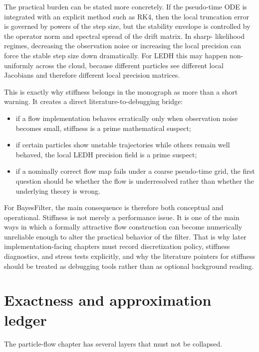 The practical burden can be stated more concretely.  If the pseudo-time ODE is
integrated with an explicit method such as RK4, then the local truncation error
is governed by powers of the step size, but the stability envelope is controlled
by the operator norm and spectral spread of the drift matrix.  In sharp-
likelihood regimes, decreasing the observation noise or increasing the local
precision can force the stable step size down dramatically.  For LEDH this may
happen non-uniformly across the cloud, because different particles see different
local Jacobians and therefore different local precision matrices.

This is exactly why stiffness belongs in the monograph as more than a short
warning.  It creates a direct literature-to-debugging bridge:
\begin{itemize}
  \item if a flow implementation behaves erratically only when observation noise
    becomes small, stiffness is a prime mathematical suspect;
  \item if certain particles show unstable trajectories while others remain well
    behaved, the local LEDH precision field is a prime suspect;
  \item if a nominally correct flow map fails under a coarse pseudo-time grid,
    the first question should be whether the flow is underresolved rather than
    whether the underlying theory is wrong.
\end{itemize}

For BayesFilter, the main consequence is therefore both conceptual and
operational.  Stiffness is not merely a performance issue.  It is one of the
main ways in which a formally attractive flow construction can become
numerically unreliable enough to alter the practical behavior of the filter.
That is why later implementation-facing chapters must record discretization
policy, stiffness diagnostics, and stress tests explicitly, and why the
literature pointers for stiffness should be treated as debugging tools rather
than as optional background reading.

\section{Exactness and approximation ledger}
\label{sec:bf-pff-claim-ledger}

The particle-flow chapter has several layers that must not be collapsed.

